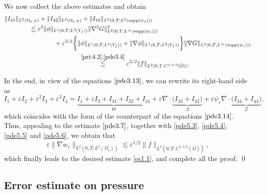 \documentclass[13pt,CJK]{article}
\theoremstyle{plain}                       %
\theoremstyle{remark}
\numberwithin{equation}{section}
\begin{document}
We now collect the above estimates and obtain
\begin{equation}\label{pde5.6}
\begin{aligned}
&\|I_{41}\|_{L^2(\Omega_{\varepsilon,T})}
+\|I_{42}\|_{L^2(\Omega_{\varepsilon,T})}
+\|I_{43}\|_{L^2(0,T;L^2(\text{supp}
(\psi_{\varepsilon})))}\\
&\qquad\qquad\lesssim
\varepsilon^{2}
\|\phi\|_{L^1(0,T;L^2(Y_f))}\|\nabla^2 G\|^2_{L^2(0,T;L^{\infty}
(\text{supp}(\psi_{\varepsilon})))}\\
&\qquad\qquad\qquad\qquad+\varepsilon^{3/2}
\bigg\{\|\phi\|_{L^1(0,T;L^2(Y_f))}+
\|\nabla\phi\|_{L^1(0,T;L^2(Y_f))}
\bigg\}
\|\nabla G\|_{L^2(0,T;L^{\infty}
(\text{supp}(\psi_{\varepsilon})))}\\
&\qquad\qquad\qquad\qquad\qquad\qquad
\overset{{\eqref{pri:4.2}, \eqref{pde3.4}}}{\lesssim}
\varepsilon^{3/2}\|f\|_{L^2(0,T;C^{1,1/2}(\bar{\Omega}))}.
\end{aligned}
\end{equation}

\medskip

In the end, in view of the equations $\eqref{pde3.13}$, we can rewrite its right-hand side
as
\begin{equation}\label{f:6.1}
I_1+\varepsilon I_2 + \varepsilon^2I_3
+\varepsilon^3 I_4
= \underbrace{I_1 + \varepsilon I_2 + I_{31}+I_{32} + I_{41}}_{\Theta}
+\varepsilon\nabla\cdot\underbrace{\big(I_{33}+I_{42}\big)}_{\Lambda}
+\varepsilon\psi_\varepsilon\nabla\cdot
\underbrace{\big(I_{34}+I_{43}\big)}_{\Xi},
\end{equation}
which coincides with the form of the counterpart of
the equations $\eqref{pde3.14}$. Thus, appealing to the estimate
$\eqref{pde3.7}$, together with  \eqref{pde5.3}, \eqref{pde5.4}, \eqref{pde5.5} and \eqref{pde5.6},
we obtain that
\begin{equation}\label{k-10}
\varepsilon
\|\nabla w_{\varepsilon}\|_{L^{2}
(0,T;L^2(\Omega_{\varepsilon}))}
\lesssim \varepsilon^{1/2}\|f\|_{L^2(0,T;C^{1,1/2}(\bar{\Omega}))},
\end{equation}
which finally leads to the desired estimate \eqref{es1.1}, and complete all the proof.
\qed


\subsection{\centering Error estimate on pressure}\label{subsec:5.3}
\end{document}
